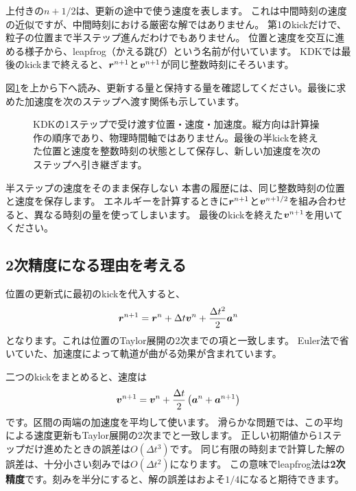 上付きの$n+1/2$は、更新の途中で使う速度を表します。
これは中間時刻の速度の近似ですが、中間時刻における厳密な解ではありません。
第1のkickだけで、粒子の位置まで半ステップ進んだわけでもありません。
位置と速度を交互に進める様子から、leapfrog（かえる跳び）という名前が付いています。
KDKでは最後のkickまで終えると、$\boldsymbol r^{n+1}$と$\boldsymbol v^{n+1}$が同じ整数時刻にそろいます。


図\ref{fig:concept-ch1-kdk}を上から下へ読み、更新する量と保持する量を確認してください。最後に求めた加速度を次のステップへ渡す関係も示しています。
\begin{figure}[!htbp]
\centering

\caption{KDKの1ステップで受け渡す位置・速度・加速度。縦方向は計算操作の順序であり、物理時間軸ではありません。最後の半kickを終えた位置と速度を整数時刻の状態として保存し、新しい加速度を次のステップへ引き継ぎます。}
\label{fig:concept-ch1-kdk}
\end{figure}
\FloatBarrier

\begin{failbox}{半ステップの速度をそのまま保存しない}
本書の履歴には、同じ整数時刻の位置と速度を保存します。
エネルギーを計算するときに$\boldsymbol r^{n+1}$と$\boldsymbol v^{n+1/2}$を組み合わせると、異なる時刻の量を使ってしまいます。
最後のkickを終えた$\boldsymbol v^{n+1}$を用いてください。
\end{failbox}

\subsection{2次精度になる理由を考える}

位置の更新式に最初のkickを代入すると、
\begin{equation}
\boldsymbol r^{n+1}=\boldsymbol r^n+\Delta t\boldsymbol v^n+\frac{\Delta t^2}{2}\boldsymbol a^n
\label{eq:ch1-kdk-position-taylor}
\end{equation}
となります。これは位置のTaylor展開の2次までの項と一致します。
Euler法で省いていた、加速度によって軌道が曲がる効果が含まれています。

二つのkickをまとめると、速度は
\begin{equation}
\boldsymbol v^{n+1}=\boldsymbol v^n+\frac{\Delta t}{2}\left(\boldsymbol a^n+\boldsymbol a^{n+1}\right)
\label{eq:ch1-kdk-average-acceleration}
\end{equation}
です。区間の両端の加速度を平均して使います。
滑らかな問題では、この平均による速度更新もTaylor展開の2次までと一致します。
正しい初期値から1ステップだけ進めたときの誤差は$O(\Delta t^3)$です。
同じ有限の時刻まで計算した解の誤差は、十分小さい刻みでは$O(\Delta t^2)$になります。
この意味でleapfrog法は\textbf{2次精度}です。刻みを半分にすると、解の誤差はおよそ$1/4$になると期待できます。


